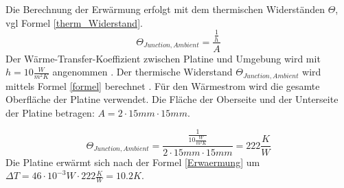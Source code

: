 \documentclass[10pt,a4paper,oneside,abstracton]{scrartcl}
\begin{document}
\begin{multicols}{2}
\noindent
Die Berechnung der Erwärmung erfolgt mit dem thermischen Widerständen $\Theta$, vgl Formel \ref*{therm_Widerstand}.
\begin{equation}
	\Theta_{Junction, Ambient} = \frac{\frac{1}{h}}{A}
	\label{therm_Widerstand}
\end{equation}
Der Wärme-Transfer-Koeffizient zwischen Platine und Umgebung 
wird mit $ h = 10 \frac{W}{m^2K}$ angenommen \cite{TI_Thermal} .\newline
Der thermische Widerstand $\Theta_{Junction, Ambient}$  wird mittels Formel \ref*{formel} berechnet . 
\newline
Für den Wärmestrom wird die gesamte Oberfläche der Platine verwendet. 
Die Fläche der Oberseite und der Unterseite der Platine betragen: \newline
$A = 2\cdot 15mm \cdot 15mm$. 

\begin{equation}
	\Theta_{Junction, Ambient} = \frac{\frac{1}{10 \frac{W}{m^2K}}}{ 2\cdot 15mm \cdot 15mm} = 222 \frac{K}{W}
	\label{formel}
\end{equation}
Die Platine erwärmt sich nach der Formel \ref{Erwaermung} um \newline
$\Delta T = 46 \cdot 10^{-3} W \cdot 222 \frac{K }{W} = 10.2 K  $.


\end{multicols}
\end{document}
